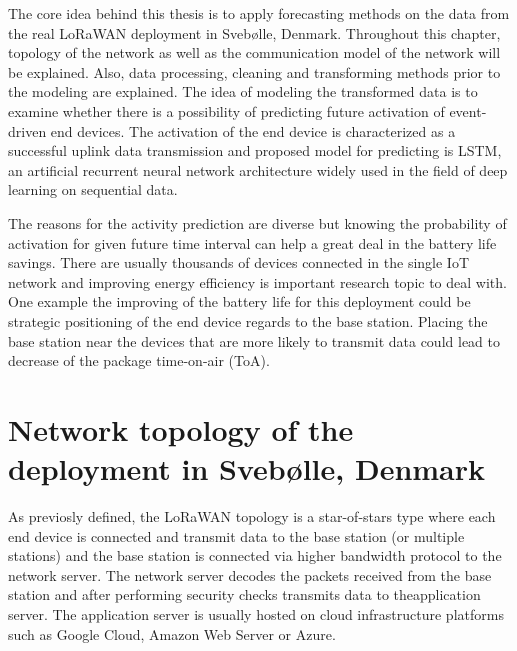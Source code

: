 
    
    

The core idea behind this thesis is to apply forecasting methods on the data from the real LoRaWAN deployment in Svebølle, Denmark.
Throughout this chapter, topology of the network as well as the communication model of the network will be explained.
Also, data processing, cleaning and transforming methods prior to the modeling are explained. 
The idea of modeling the transformed data is to examine whether there is a possibility of predicting future activation of event-driven end devices.
The activation of the end device is characterized as a successful uplink data transmission and proposed model for predicting is LSTM, an artificial recurrent neural network architecture widely used in the field of deep learning on sequential data.

The reasons for the activity prediction are diverse but knowing the probability of activation for given future time interval can help a great deal in the battery life savings.
There are usually thousands of devices connected in the single IoT network and improving energy efficiency is important research topic to deal with. 
One example the improving of the battery life for this deployment could be strategic positioning of the end device regards to the base station. 
Placing the base station near the devices that are more likely to transmit data could lead to decrease of the package time-on-air (ToA).


\section{Network topology of the deployment in Svebølle, Denmark}
As previosly defined, the LoRaWAN topology is a star-of-stars type where each end device is connected and transmit data to the base station (or multiple stations) and the base station is connected via higher bandwidth protocol to the network server.
The network server decodes the packets received from the base station and after performing security checks transmits data to theapplication server.
The application server is usually hosted on cloud infrastructure platforms such as Google Cloud, Amazon Web Server or Azure.

